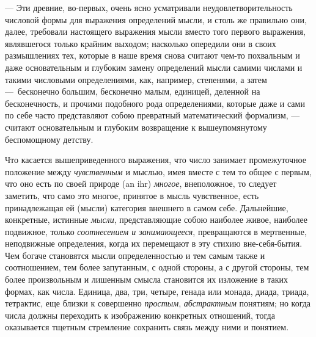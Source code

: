 — Эти древние, во-первых, очень ясно усматривали неудовлетворительность
числовой формы для выражения определений мысли, и столь же правильно они,
далее, требовали настоящего выражения мысли вместо того первого выражения,
являвшегося только крайним выходом; насколько опередили они в своих
размышлениях тех, которые в наше время снова считают чем-то похвальным и
даже основательным и глубоким замену определений мысли самими числами и
такими числовыми определениями, как, например, степенями, а затем
—~бесконечно большим, бесконечно малым, единицей, деленной на
бесконечность, и прочими подобного рода
определениями, которые даже и сами по
себе часто представляют собою превратный математический формализм, —
считают основательным и глубоким возвращение к вышеупомянутому беспомощному
детству.

Что касается вышеприведенного выражения, что число занимает промежуточное
положение между {\em чувственным} и мыслью, имея вместе
с тем то общее с первым, что оно есть по своей природе (an ihr)
{\em многое}, внеположное, то следует заметить, что
само это многое, принятое в мысль чувственное, есть принадлежащая ей
(мысли) категория внешнего в самом себе. Дальнейшие, конкретные, истинные
{\em мысли}, представляющие собою наиболее живое,
наиболее подвижное, только {\em соотнесением и
занимающееся}, превращаются в мертвенные, неподвижные определения, когда их
перемещают в эту стихию вне-себя-бытия. Чем богаче становятся мысли
определенностью и тем самым также и соотношением, тем более запутанным, с
одной стороны, а с другой стороны, тем более произвольным и лишенным смысла
становится их изложение в таких формах, как числа. Единица, два, три,
четыре, генада или монада, диада, триада, тетрактис, еще близки к
совершенно {\em простым},
{\em абстрактным} понятиям; но когда числа должны
переходить к изображению конкретных отношений, тогда оказывается тщетным
стремление сохранить связь между ними и понятием.

